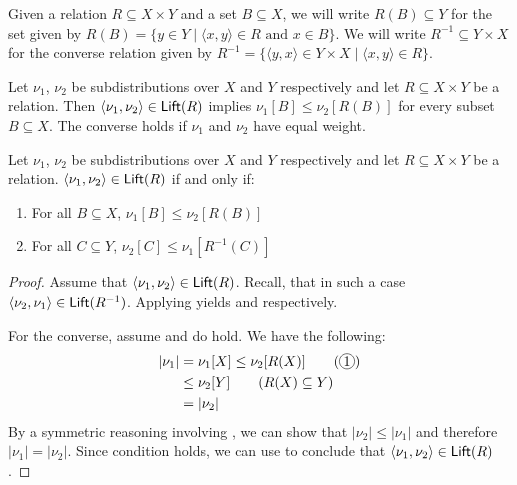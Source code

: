 Given a relation ${R}\subseteq{X \times Y}$ and a set $B \subseteq X$, we will write $R(B) \subseteq Y$ for the set given by $R(B)= \{y \in Y \mid \langle x,y \rangle \in R \text{ and } x \in B\}$. We will write $R^{-1} \subseteq Y \times X$ for the converse relation given by $R^{-1} = \{\langle y,x \rangle \in Y \times X \mid \langle x,y \rangle \in R\}$. 
\begin{theorem}\label{thm:coupling_theorem}
Let $\nu_1$, $\nu_2$ be subdistributions over $X$ and $Y$ respectively and let $R \subseteq X \times Y$ be a relation. Then $\langle \nu_1, \nu_2\rangle \in \mathsf{Lift} (R) $ implies $\nu_1[B] \leq \nu_2[R(B)]$ for every subset $B \subseteq X$. The converse holds if $\nu_1$ and $\nu_2$ have equal weight.
\end{theorem}
\begin{lemma}\label{apx:lem:coupling_lemma}
Let $\nu_1$, $\nu_2$ be subdistributions over $X$ and $Y$ respectively and let $R \subseteq X \times Y$ be a relation. $\langle \nu_1 , \nu_2 \rangle \in \mathsf{Lift}(R)$ if and only if:
\begin{enumerate}
	\item For all $B \subseteq X$,  $\nu_1[B] \leq \nu_2[R(B)]$
	\item For all $C \subseteq Y$, $\nu_2[C] \leq \nu_1[R^{-1}(C)]$
\end{enumerate}
\end{lemma}
\begin{proof}
	Assume that $\langle \nu_1 ,\nu_2 \rangle \in \mathsf{Lift}(R)$. Recall, that in such a case $\langle \nu_2 ,\nu_1 \rangle \in \mathsf{Lift}(R^{-1})$. Applying  yields  and  respectively.
	
	For the converse, assume  and  do hold. We have the following:
\begin{align*}
	|\nu_1| &= \nu_1[X] \leq \nu_2[R(X)] \tag{\circlednum{1}} \\
	&\leq \nu_2[Y] \tag{$R(X) \subseteq Y$}\\
	&= |\nu_2|
\end{align*}
By a symmetric reasoning involving , we can show that $|\nu_2| \leq |\nu_1|$ and therefore $|\nu_1| = |\nu_2|$. Since condition  holds, we can use  to conclude that $\langle \nu_1 ,\nu_2 \rangle \in \mathsf{Lift}(R)$.
\end{proof}
